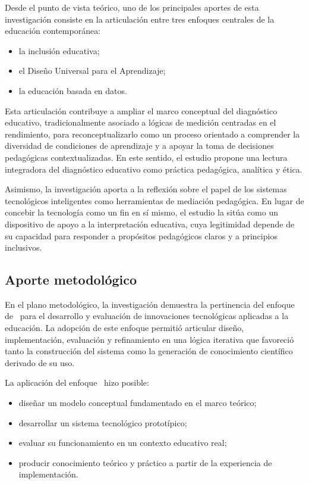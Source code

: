 \begin{refsection}
Desde el punto de vista teórico, uno de los principales aportes de esta investigación consiste en la articulación entre tres enfoques centrales de la educación contemporánea:

\begin{itemize}
\item la inclusión educativa;
\item el Diseño Universal para el Aprendizaje;
\item la educación basada en datos.
\end{itemize}

Esta articulación contribuye a ampliar el marco conceptual del diagnóstico educativo, tradicionalmente asociado a lógicas de medición centradas en el rendimiento, para reconceptualizarlo como un proceso orientado a comprender la diversidad de condiciones de aprendizaje y a apoyar la toma de decisiones pedagógicas contextualizadas. En este sentido, el estudio propone una lectura integradora del diagnóstico educativo como práctica pedagógica, analítica y ética.

Asimismo, la investigación aporta a la reflexión sobre el papel de los sistemas tecnológicos inteligentes como herramientas de mediación pedagógica. En lugar de concebir la tecnología como un fin en sí mismo, el estudio la sitúa como un dispositivo de apoyo a la interpretación educativa, cuya legitimidad depende de su capacidad para responder a propósitos pedagógicos claros y a principios inclusivos.

\subsection{Aporte metodológico}

En el plano metodológico, la investigación demuestra la pertinencia del enfoque de \DBR\ para el desarrollo y evaluación de innovaciones tecnológicas aplicadas a la educación. La adopción de este enfoque permitió articular diseño, implementación, evaluación y refinamiento en una lógica iterativa que favoreció tanto la construcción del sistema como la generación de conocimiento científico derivado de su uso.

La aplicación del enfoque \DBR\ hizo posible:

\begin{itemize}
\item diseñar un modelo conceptual fundamentado en el marco teórico;
\item desarrollar un sistema tecnológico prototípico;
\item evaluar su funcionamiento en un contexto educativo real;
\item producir conocimiento teórico y práctico a partir de la experiencia de implementación.
\end{itemize}


\end{refsection}
